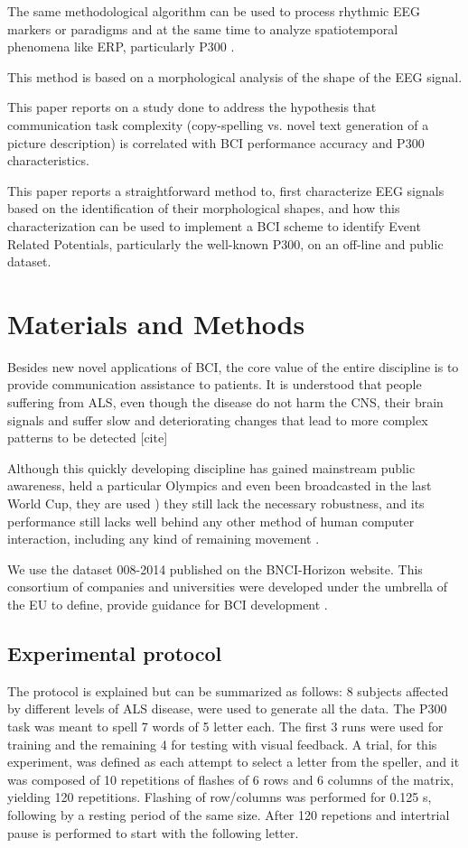\documentclass[entropy,article,submit,moreauthors,pdftex,10pt,a4paper]{mdpi}
\begin{document}
The same methodological algorithm can be used to process rhythmic EEG markers or paradigms and at the same time to analyze spatiotemporal phenomena like ERP, particularly P300 \citep{Ramele2016}.

This method is based on a morphological analysis of the shape of the EEG signal.

This paper reports on a study done to address
the hypothesis that communication task complexity
(copy-spelling vs. novel text generation of a picture
description) is correlated with BCI performance accuracy
and P300 characteristics.

This paper reports a straightforward method to, first characterize EEG signals based on the identification of their morphological shapes, and how this characterization can be used to implement a BCI scheme to identify Event Related Potentials, particularly the well-known P300, on an off-line and public dataset.


\section{Materials and Methods}

Besides new novel applications of BCI, the core value of the entire discipline is to provide communication assistance to patients.  It is understood that people suffering from ALS, even though the disease do not harm the CNS, their brain signals and suffer slow and deteriorating changes that lead to more complex patterns to be detected [cite]

Although this quickly developing discipline has gained mainstream public awareness, held a particular  Olympics \citep{Cybatholn} and even been broadcasted in the last World Cup,  they are used \citep{Huggins2016}) they still lack the necessary robustness, and its performance still lacks well behind any other method of human computer interaction, including any kind of remaining movement \citep{Clerc}.

We use the dataset 008-2014 published on the BNCI-Horizon website.  This consortium of companies and universities were developed under the umbrella of the EU to define, provide guidance for BCI development \citep{Riccio2013}.

\subsection{Experimental protocol}

The protocol is explained \citep{Riccio2013} but can be summarized as follows:  8 subjects affected by different levels of ALS disease, were used to generate all the data. The P300 task was meant to spell 7 words of 5 letter each.  The first 3 runs were used for training and the remaining 4 for testing with visual feedback.  A trial, for this experiment, was defined as each attempt to select a letter from the speller, and it was composed of 10 repetitions of flashes of 6 rows and 6 columns of the matrix, yielding 120 repetitions.  Flashing of row/columns was performed for 0.125 s, following by a resting period of the same size.  After 120 repetions and intertrial pause is performed to start with the following letter.
\end{document}
